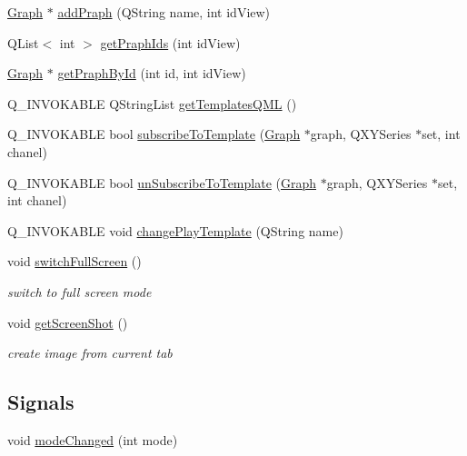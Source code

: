\begin{DoxyCompactItemize}
\item 
\hyperlink{class_graph}{Graph} $\ast$ \hyperlink{class_main_widget_add0a22a4b6838c7a07e48cf6a9f4ecb3}{add\+Praph} (Q\+String name, int id\+View)
\item 
Q\+List$<$ int $>$ \hyperlink{class_main_widget_ab020265c95f21766b1aa1f8c426e7f34}{get\+Praph\+Ids} (int id\+View)
\item 
\hyperlink{class_graph}{Graph} $\ast$ \hyperlink{class_main_widget_a5f07ccab510c6d5674b0a301ce0b9712}{get\+Praph\+By\+Id} (int id, int id\+View)
\item 
Q\+\_\+\+I\+N\+V\+O\+K\+A\+B\+LE Q\+String\+List \hyperlink{class_main_widget_ae77e3f796aea1d773586b1ef381061c1}{get\+Templates\+Q\+ML} ()
\item 
Q\+\_\+\+I\+N\+V\+O\+K\+A\+B\+LE bool \hyperlink{class_main_widget_adf1350b871ca05e3c3af8306d7e07acf}{subscribe\+To\+Template} (\hyperlink{class_graph}{Graph} $\ast$graph, Q\+X\+Y\+Series $\ast$set, int chanel)
\item 
Q\+\_\+\+I\+N\+V\+O\+K\+A\+B\+LE bool \hyperlink{class_main_widget_aafe021c318c70fbf579693ff767bce27}{un\+Subscribe\+To\+Template} (\hyperlink{class_graph}{Graph} $\ast$graph, Q\+X\+Y\+Series $\ast$set, int chanel)
\item 
Q\+\_\+\+I\+N\+V\+O\+K\+A\+B\+LE void \hyperlink{class_main_widget_aa52172d75102af3717d82ad3146065f1}{change\+Play\+Template} (Q\+String name)
\item 
void \hyperlink{class_main_widget_a798a61a3c09fbb3763f93c8aa7ea8a77}{switch\+Full\+Screen} ()
\begin{DoxyCompactList}\small\item\em switch to full screen mode \end{DoxyCompactList}\item 
void \hyperlink{class_main_widget_ad7b4fcd48d785d3b6d71160971e205a1}{get\+Screen\+Shot} ()
\begin{DoxyCompactList}\small\item\em create image from current tab \end{DoxyCompactList}\end{DoxyCompactItemize}
\subsection*{Signals}
\begin{DoxyCompactItemize}
\item 
void \hyperlink{class_main_widget_a7ee933a7699c2d3f6e1f489f822640a4}{mode\+Changed} (int mode)
\end{DoxyCompactItemize}
